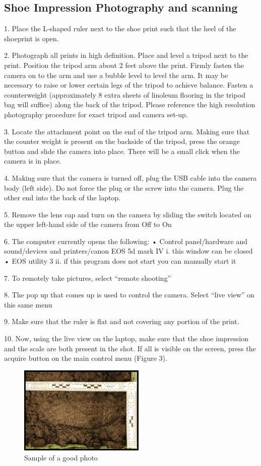 \subsection{Shoe Impression Photography and scanning}

1. Place the L-shaped ruler next to the shoe print such that the heel of the shoeprint is open.

2. Photograph all prints in high definition. Place and level a tripod next to the print. Position the tripod arm about 2 feet above the print. Firmly fasten the camera on to the arm and use a bubble level to level  the arm. It may be necessary to raise or lower certain legs of the tripod to achieve balance. Fasten a counterweight (approximately 8 extra sheets of linoleum flooring in the tripod bag will suffice) along the back of the tripod. Please reference the high resolution photography procedure for exact tripod and camera set-up. 

3.  Locate the attachment point on the end of the tripod arm. Making sure that the counter weight is present on the backside of the tripod, press the orange button and slide the camera into place. There will be a small click when the camera is in place. 

4. Making sure that the camera is turned off, plug the USB cable into the camera body (left side). Do not force the plug or the screw into the camera. Plug the other end into the back of the laptop. 

5. Remove the lens cap and turn on the camera by sliding the switch located on the upper left-hand side of the camera from Off to On

6. The computer currently opens the following:
•	Control panel/hardware and sound/devices and printers/canon EOS 5d mark IV
i.	this window can be closed
•	EOS utility 3
ii.	if this program does not start you can manually start it

7. To remotely take pictures, select “remote shooting”

8. The pop up that comes up is used to control the camera. Select “live view” on this same menu

9. Make sure that the ruler is flat and not covering any portion of the print. 

10. Now, using the live view on the laptop, make sure that the shoe impression and the scale are both present in the shot. If all is visible on the screen, press the acquire button on the main control menu (Figure 3). 

\begin{figure}[!htp]
\centering
\includegraphics[width=6cm]{CastPhoto2}
\caption{Sample of a good photo }
\label{Image 3}
\end{figure}

